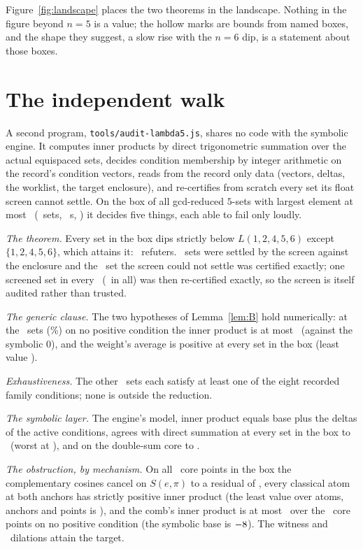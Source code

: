 \documentclass[11pt]{article}
\newcommand{\Lf}{L(1,2,4,5,6)}
\begin{document}
Figure~\ref{fig:landscape} places the two theorems in the landscape. Nothing in the figure beyond $n=5$ is a value; the hollow marks are bounds from named boxes, and the shape they suggest, a slow rise with the $n=6$ dip, is a statement about those boxes.

\section{The independent walk}\label{sec:audit}

A second program, \texttt{tools/audit-lambda5.js}, shares no code with the symbolic engine. It computes inner products by direct trigonometric summation over the actual equispaced sets, decides condition membership by integer arithmetic on the record's condition vectors, reads from the record only data (vectors, deltas, the worklist, the target enclosure), and re-certifies from scratch every set its float screen cannot settle. On the box of all gcd-reduced $5$-sets with largest element at most \AudBox\ (\AudSets\ sets, \AudSeconds\ s, \AudDate) it decides five things, each able to fail only loudly.

\emph{The theorem.} Every set in the box dips strictly below $\Lf$ except $\{1,2,4,5,6\}$, which attains it: \AudRefuters\ refuters. \AudScreened\ sets were settled by the screen against the enclosure and the \AudExact\ set the screen could not settle was certified exactly; one screened set in every \AudSampleEvery\ (\AudScreenAudited\ in all) was then re-certified exactly, so the screen is itself audited rather than trusted.

\emph{The generic clause.} The two hypotheses of Lemma~\ref{lem:B} hold numerically: at the \AudGenericClosed\ sets (\AudGenericPct\%) on no positive condition the inner product is at most \AudWorstGeneric\ (against the symbolic $0$), and the weight's average is positive at every set in the box (least value \AudMinWeight).

\emph{Exhaustiveness.} The other \AudFamilyReached\ sets each satisfy at least one of the eight recorded family conditions; none is outside the reduction.

\emph{The symbolic layer.} The engine's model, inner product equals base plus the deltas of the active conditions, agrees with direct summation at every set in the box to \AudSymGap\ (worst at \AudSymWorstAt), and on the double-sum core to \AudCoreGap.

\emph{The obstruction, by mechanism.} On all \AudCorePoints\ core points in the box the complementary cosines cancel on $S(e,\pi)$ to a residual of \AudCancel, every classical atom at both anchors has strictly positive inner product (the least value over atoms, anchors and points is \AudClassicalWorst), and the comb's inner product is at most \AudCombWorst\ over the \AudCombPoints\ core points on no positive condition (the symbolic base is $-8$). The witness and \AudDilations\ dilations attain the target.
\end{document}
